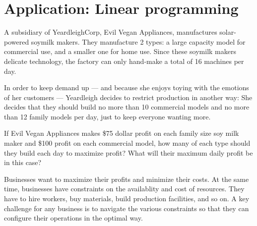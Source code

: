 
\section{Application: Linear programming}
\label{sec:linearprogramming}

\begin{boxexplore}
A subsidiary of YeardleighCorp, Evil Vegan Appliances, manufactures solar-powered soymilk makers. They manufacture 2 types: a large capacity model for commercial use, and a smaller one for home use. Since these soymilk makers delicate technology, the factory can only hand-make a total of 16 machines per day.

In order to keep demand up --- and because she enjoys toying with the emotions of her customers --- Yeardleigh decides to restrict production in another way: She decides that they should build no more than 10 commercial models and no more than 12 family models per day, just to keep everyone wanting more.

If Evil Vegan Appliances makes \$75 dollar profit on each family size soy milk maker and \$100 profit on each commercial model, how many of each type should they build each day to maximize profit? What will their maximum daily profit be in this case?
\end{boxexplore}


Businesses want to maximize their profits and minimize their costs. At the same time, businesses have constraints on the availablity and cost of resources. They have to hire workers, buy materials, build production facilities, and so on. A key challenge for any business is to navigate the various constraints so that they can configure their operations in the optimal way.

